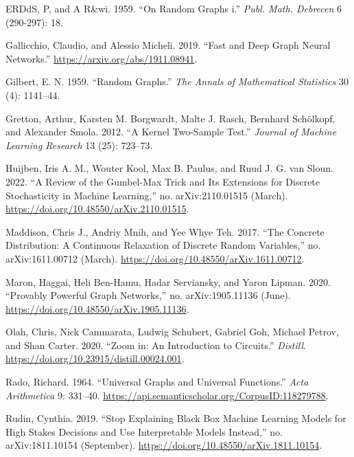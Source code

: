 \documentclass[
  11pt,
  letterpaper,
]{article}
\newlength{\cslhangindent}
\newlength{\cslentryspacingunit} %
\newenvironment{CSLReferences}[2] %
 {%
  \setlength{\parindent}{0pt}
  \ifodd #1
  \let\oldpar\par
  \def\par{\hangindent=\cslhangindent\oldpar}
  \fi
  \setlength{\parskip}{#2\cslentryspacingunit}
 }%
 {}
\begin{document}
\begin{CSLReferences}{1}{0}
\leavevmode{}%
ERDdS, P, and A R\&wi. 1959. {``On Random Graphs i.''} \emph{Publ. Math.
Debrecen} 6 (290-297): 18.

\leavevmode{}%
Gallicchio, Claudio, and Alessio Micheli. 2019. {``Fast and Deep Graph
Neural Networks.''} \url{https://arxiv.org/abs/1911.08941}.

\leavevmode{}%
Gilbert, E. N. 1959. {``Random Graphs.''} \emph{The Annals of
Mathematical Statistics} 30 (4): 1141--44.

\leavevmode{}%
Gretton, Arthur, Karsten M. Borgwardt, Malte J. Rasch, Bernhard
Schölkopf, and Alexander Smola. 2012. {``A Kernel Two-Sample Test.''}
\emph{Journal of Machine Learning Research} 13 (25): 723--73.

\leavevmode{}%
Huijben, Iris A. M., Wouter Kool, Max B. Paulus, and Ruud J. G. van
Sloun. 2022. {``A Review of the Gumbel-Max Trick and Its Extensions for
Discrete Stochasticity in Machine Learning,''} no. arXiv:2110.01515
(March). \url{https://doi.org/10.48550/arXiv.2110.01515}.

\leavevmode{}%
Maddison, Chris J., Andriy Mnih, and Yee Whye Teh. 2017. {``The Concrete
Distribution: A Continuous Relaxation of Discrete Random Variables,''}
no. arXiv:1611.00712 (March).
\url{https://doi.org/10.48550/arXiv.1611.00712}.

\leavevmode{}%
Maron, Haggai, Heli Ben-Hamu, Hadar Serviansky, and Yaron Lipman. 2020.
{``Provably Powerful Graph Networks,''} no. arXiv:1905.11136 (June).
\url{https://doi.org/10.48550/arXiv.1905.11136}.

\leavevmode{}%
Olah, Chris, Nick Cammarata, Ludwig Schubert, Gabriel Goh, Michael
Petrov, and Shan Carter. 2020. {``Zoom in: An Introduction to
Circuits.''} \emph{Distill}.
\url{https://doi.org/10.23915/distill.00024.001}.

\leavevmode{}%
Rado, Richard. 1964. {``Universal Graphs and Universal Functions.''}
\emph{Acta Arithmetica} 9: 331--40.
\url{https://api.semanticscholar.org/CorpusID:118279788}.

\leavevmode{}%
Rudin, Cynthia. 2019. {``Stop Explaining Black Box Machine Learning
Models for High Stakes Decisions and Use Interpretable Models
Instead,''} no. arXiv:1811.10154 (September).
\url{https://doi.org/10.48550/arXiv.1811.10154}.


\end{CSLReferences}
\end{document}
